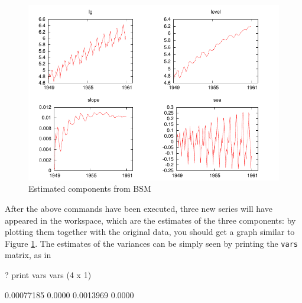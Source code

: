 \begin{figure}[htbp]
  \centering
  \includegraphics{figures/BSM-output}
  \caption{Estimated components from BSM}
  \label{fig:BSM-output}
\end{figure}

After the above commands have been executed, three new series will
have appeared in the  workspace, which are the estimates of
the three components: by plotting them together with the original
data, you should get a graph similar to Figure
\ref{fig:BSM-output}. The estimates of the variances can be simply
seen by printing the \texttt{vars} matrix, as in

\begin{code}
? print vars
vars (4 x 1)

  0.00077185 
      0.0000 
   0.0013969 
      0.0000 
\end{code}


